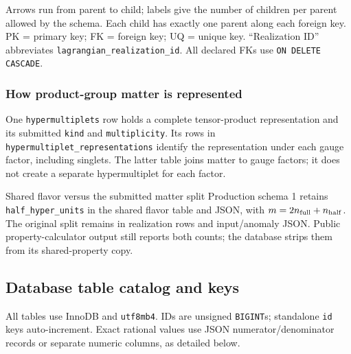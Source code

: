 \documentclass[11pt,a4paper]{article}
\numberwithin{equation}{section}
\newcommand{\code}[1]{{\small\nolinkurl{#1}}}
\begin{document}
{\small Arrows run from parent to child; labels give the number of children per
parent allowed by the schema. Each child has exactly one parent along each
foreign key. PK = primary key; FK = foreign key; UQ = unique key. ``Realization
ID'' abbreviates \code{lagrangian_realization_id}. All declared FKs use
\texttt{ON DELETE CASCADE}.}

\subsubsection{How product-group matter is represented}
One \code{hypermultiplets} row holds a complete tensor-product representation
and its submitted \code{kind} and \code{multiplicity}. Its rows in
\code{hypermultiplet_representations} identify the representation under each
gauge factor, including singlets. The latter table joins matter to gauge
factors; it does not create a separate hypermultiplet for each factor.

\begin{note}{Shared flavor versus the submitted matter split}
Production schema 1 retains \code{half_hyper_units} in the shared flavor table and JSON,
with $m=2n_{\rm full}+n_{\rm half}$. The original split remains in realization
rows and input/anomaly JSON. Public property-calculator output still reports
both counts; the database strips them from its shared-property copy.
\end{note}

\clearpage
\subsection{Database table catalog and keys}\label{sec:db-tables}
All tables use InnoDB and \code{utf8mb4}. IDs are unsigned \code{BIGINT}s;
standalone \code{id} keys auto-increment. Exact rational values use JSON
numerator/denominator records or separate numeric columns, as detailed below.
\end{document}
